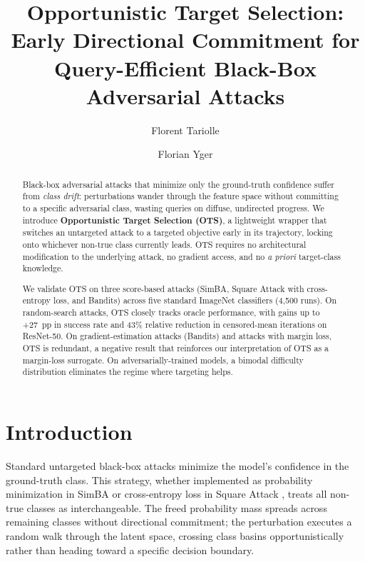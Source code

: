\documentclass{cap2026}
\title{Opportunistic Target Selection: Early Directional Commitment for Query-Efficient Black-Box Adversarial Attacks}
\author[1]{Florent Tariolle}
\author[1]{Florian Yger}
\affil[1]{INSA Rouen Normandie}
\begin{document}
\maketitle

\begin{abstract}
Black-box adversarial attacks that minimize only the ground-truth confidence suffer from \textit{class drift}: perturbations wander through the feature space without committing to a specific adversarial class, wasting queries on diffuse, undirected progress. We introduce \textbf{Opportunistic Target Selection (OTS)}, a lightweight wrapper that switches an untargeted attack to a targeted objective early in its trajectory, locking onto whichever non-true class currently leads. OTS requires no architectural modification to the underlying attack, no gradient access, and no \textit{a priori} target-class knowledge.

We validate OTS on three score-based attacks (SimBA, Square Attack with cross-entropy loss, and Bandits) across five standard ImageNet classifiers (4,500 runs). On random-search attacks, OTS closely tracks oracle performance, with gains up to +27~pp in success rate and 43\% relative reduction in censored-mean iterations on ResNet-50. On gradient-estimation attacks (Bandits) and attacks with margin loss, OTS is redundant, a negative result that reinforces our interpretation of OTS as a margin-loss surrogate. On adversarially-trained models, a bimodal difficulty distribution eliminates the regime where targeting helps.

\medskip
{}
\end{abstract}

\section{Introduction}\label{sec:introduction}

Standard untargeted black-box attacks minimize the model's confidence in the ground-truth class. This strategy, whether implemented as probability minimization in SimBA \citep{guo2019simple} or cross-entropy loss in Square Attack \citep{andriushchenko2020square}, treats all non-true classes as interchangeable. The freed probability mass spreads across remaining classes without directional commitment; the perturbation executes a random walk through the latent space, crossing class basins opportunistically rather than heading toward a specific decision boundary.
\end{document}
